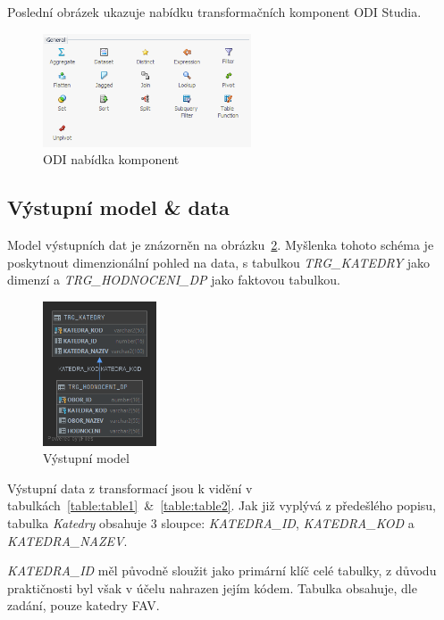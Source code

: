Poslední obrázek ukazuje nabídku transformačních komponent ODI Studia.

\begin{figure}[htb]
    \centering
    \includegraphics[width=0.55\textwidth]{graphs/odi-transformation-components.png}
    \caption{ODI nabídka komponent}
    \label{fig:odi-transformation-components}
\end{figure}
\FloatBarrier

\subsection{Výstupní model \& data}

Model výstupních dat je znázorněn na obrázku~\ref{fig:trg-model}.
Myšlenka tohoto schéma je poskytnout dimenzionální pohled na data, s tabulkou \textit{TRG\_KATEDRY} jako dimenzí a \textit{TRG\_HODNOCENI\_DP} jako faktovou tabulkou.

\begin{figure}[htb]
    \centering
    \includegraphics[width=0.3\textwidth]{graphs/trg-model.png}
    \caption{Výstupní model}
    \label{fig:trg-model}
\end{figure}
\FloatBarrier

Výstupní data z transformací jsou k vidění v tabulkách~\ref{table:table1}~\&~\ref{table:table2}.
Jak již vyplývá z předešlého popisu, tabulka \textit{Katedry} obsahuje 3 sloupce: \textit{KATEDRA\_ID}, \textit{KATEDRA\_KOD} a \textit{KATEDRA\_NAZEV}.

\textit{KATEDRA\_ID} měl původně sloužit jako primární klíč celé tabulky, z důvodu praktičnosti byl však v účelu nahrazen jejím kódem.
Tabulka obsahuje, dle zadání, pouze katedry FAV.

